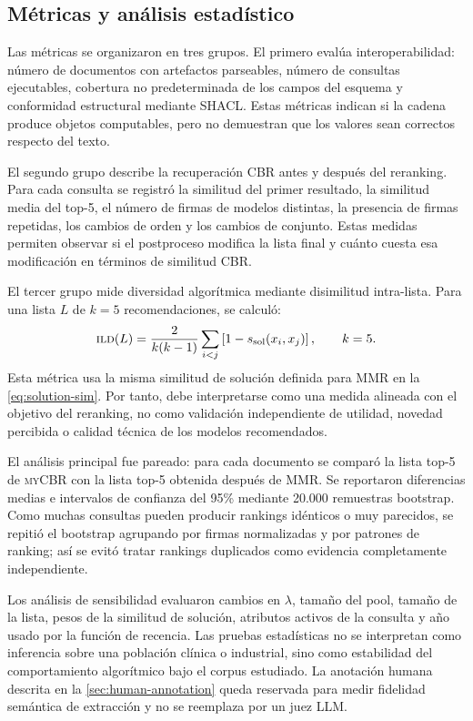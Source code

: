 \documentclass[11pt,a4paper]{article}
\newcommand{\myCBR}{\textsc{myCBR}}
\newcommand{\ILD}{\textsc{ild}}
\begin{document}
\subsection{Métricas y análisis estadístico}

Las métricas se organizaron en tres grupos. El primero evalúa interoperabilidad: número de documentos con artefactos parseables, número de consultas ejecutables, cobertura no predeterminada de los campos del esquema y conformidad estructural mediante SHACL. Estas métricas indican si la cadena produce objetos computables, pero no demuestran que los valores sean correctos respecto del texto.

El segundo grupo describe la recuperación CBR antes y después del reranking. Para cada consulta se registró la similitud del primer resultado, la similitud media del top-5, el número de firmas de modelos distintas, la presencia de firmas repetidas, los cambios de orden y los cambios de conjunto. Estas medidas permiten observar si el postproceso modifica la lista final y cuánto cuesta esa modificación en términos de similitud CBR.

El tercer grupo mide diversidad algorítmica mediante disimilitud intra-lista. Para una lista $L$ de $k=5$ recomendaciones, se calculó:
\begin{equation}
 \ILD(L)=\frac{2}{k(k-1)}\sum_{i<j}\left[1-s_{\mathrm{sol}}(x_i,x_j)\right],\qquad k=5.
 \label{eq:ild}
\end{equation}
Esta métrica usa la misma similitud de solución definida para MMR en la \cref{eq:solution-sim}. Por tanto, debe interpretarse como una medida alineada con el objetivo del reranking, no como validación independiente de utilidad, novedad percibida o calidad técnica de los modelos recomendados.

El análisis principal fue pareado: para cada documento se comparó la lista top-5 de \myCBR{} con la lista top-5 obtenida después de MMR. Se reportaron diferencias medias e intervalos de confianza del 95\% mediante 20.000 remuestras bootstrap. Como muchas consultas pueden producir rankings idénticos o muy parecidos, se repitió el bootstrap agrupando por firmas normalizadas y por patrones de ranking; así se evitó tratar rankings duplicados como evidencia completamente independiente.

Los análisis de sensibilidad evaluaron cambios en $\lambda$, tamaño del pool, tamaño de la lista, pesos de la similitud de solución, atributos activos de la consulta y año usado por la función de recencia. Las pruebas estadísticas no se interpretan como inferencia sobre una población clínica o industrial, sino como estabilidad del comportamiento algorítmico bajo el corpus estudiado. La anotación humana descrita en la \cref{sec:human-annotation} queda reservada para medir fidelidad semántica de extracción y no se reemplaza por un juez LLM.
\end{document}
